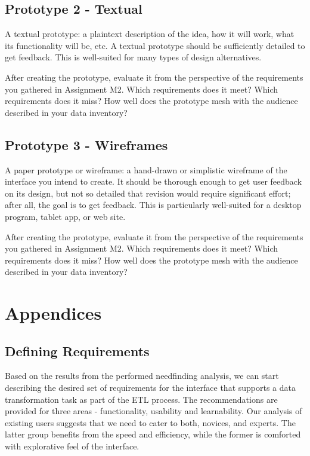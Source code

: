 \documentclass[12pt,letterpaper]{article}
\begin{document}
\subsection*{Prototype 2 - Textual}

A textual prototype: a plaintext description of the idea, how it will work, what its functionality will be, etc. A textual prototype should be sufficiently detailed to get feedback. This is well-suited for many types of design alternatives.

After creating the prototype, evaluate it from the perspective of the requirements you gathered in Assignment M2. Which requirements does it meet? Which requirements does it miss? How well does the prototype mesh with the audience described in your data inventory?

\subsection*{Prototype 3 - Wireframes}

A paper prototype or wireframe: a hand-drawn or simplistic wireframe of the interface you intend to create. It should be thorough enough to get user feedback on its design, but not so detailed that revision would require significant effort; after all, the goal is to get feedback. This is particularly well-suited for a desktop program, tablet app, or web site.

After creating the prototype, evaluate it from the perspective of the requirements you gathered in Assignment M2. Which requirements does it meet? Which requirements does it miss? How well does the prototype mesh with the audience described in your data inventory?

 


\newpage
\section*{Appendices}

\appendix

\subsection*{Defining Requirements}

Based on the results from the performed needfinding analysis, we can start describing the desired set of requirements for the interface that supports a data transformation task as part of the ETL process. The recommendations are provided for three areas - functionality, usability and learnability. Our analysis of existing users suggests that we need to cater to both, novices, and experts. The latter group benefits from the speed and efficiency, while the former is comforted with explorative feel of the interface.
\end{document}

